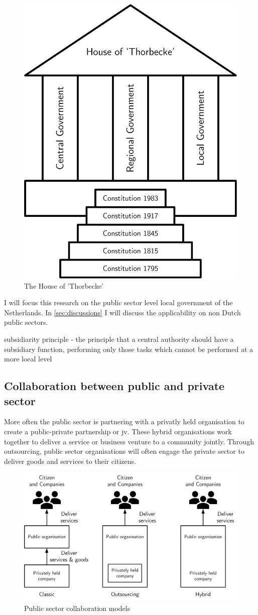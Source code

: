 \begin{figure}[H]
	\centering
	\includegraphics[width=0.4\linewidth]{images/thorbecke}
	\caption[The House of 'Thorbecke']{The House of 'Thorbecke'}
	\label{fig:houseofthorbecke}
\end{figure}



I will focus this research on the public sector level local government of the Netherlands. In \cref{sec:discussions} I will discuss the applicability on non Dutch public sectors.



subsidiarity principle - the principle that a central authority should have a subsidiary function, performing only those tasks which cannot be performed at a more local level


\subsection{Collaboration between public and private sector}

More often the public sector is partnering with a privatly held organisation to create a public-private partnership or \acrfull{jv}. These hybrid organisations work together to deliver a service or business venture to a community jointly. Through outsourcing, public sector organisations will often engage the private sector to deliver goods and services to their citizens. 

\begin{figure}[H]
	\centering
	\includegraphics[width=0.7\linewidth]{images/publicsector3modelsofcolaboration}
	\caption[Public sector collaboration models]{Public sector collaboration models}
	\label{fig:publicsector3modelsofcolaboration}
\end{figure}

